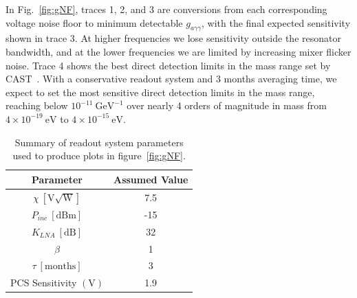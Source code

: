 \documentclass[
  aps,
  physrev,
  reprint,
  superscriptaddress,
  nofootinbib,
  amsmath,
  amssymb
]{revtex4-2}
\begin{document}
In Fig.~\ref{fig:gNF}, traces 1, 2, and 3 are conversions from each corresponding voltage noise floor to minimum detectable $g_{a\gamma\gamma}$, with the final expected sensitivity shown in trace 3. At higher frequencies we lose sensitivity outside the resonator bandwidth, and at the lower frequencies we are limited by increasing mixer flicker noise. Trace 4 shows the best direct detection limits in the mass range set by CAST~\cite{altenmuller_new_2024}. With a conservative readout system and 3 months averaging time, we expect to set the most sensitive direct detection limits in the mass range, reaching below $10^{-11}~\mathrm{GeV}^{-1}$ over nearly 4 orders of magnitude in mass from $4\times10^{-19}~\mathrm{eV}$ to $4\times10^{-15}~\mathrm{eV}$.

\begin{table}[!t] 
    \caption{Summary of readout system parameters used to produce plots in figure~\ref{fig:gNF}.}
    \label{tab:readoutParams}
    \begin{ruledtabular}
        \begin{tabular}{cc}
            \textbf{Parameter} &
            \textbf{Assumed Value} \\
            \hline
            $\chi~[\mathrm{V}\sqrt{\mathrm{W}}]$ & 7.5 \\
            $P_{inc}~[\mathrm{dBm}]$ & -15\\
            $K_{LNA}~[\mathrm{dB}]$& 32 \\
            $\beta$ & 1 \\
            $\tau~[\mathrm{months}]$ & 3\\
            PCS Sensitivity $(\mathrm{V})$ & 1.9 \\
        \end{tabular}
    \end{ruledtabular}
\end{table}
\end{document}
